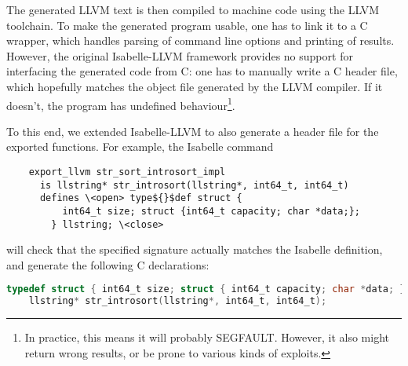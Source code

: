 \documentclass[runningheads]{llncs}
\begin{document}
{  The generated LLVM text is then compiled to machine code using the LLVM toolchain.
  To make the generated program usable, one has to link it to a C wrapper, which handles parsing of command line options and printing of results.
  However, the original Isabelle-LLVM framework provides no support for interfacing the generated code from C: one has to manually write a C header file, which hopefully matches the object file generated by the LLVM compiler. If it doesn't, the program has undefined behaviour\footnote{In practice, this means it will probably SEGFAULT. However, it also might return wrong results, or be prone to various kinds of exploits.}.


  To this end, we extended Isabelle-LLVM to also generate a header file for the exported functions. For example, the Isabelle command
  {\small\begin{lstlisting}
    export_llvm str_sort_introsort_impl
      is llstring* str_introsort(llstring*, int64_t, int64_t)
      defines \<open> type${}$def struct {
          int64_t size; struct {int64_t capacity; char *data;};
        } llstring; \<close>
  \end{lstlisting}}
  \noindent will check that the specified signature actually matches the Isabelle definition, and generate the following
  C declarations:
  {\small\begin{lstlisting}[language=C]
    typedef struct { int64_t size; struct { int64_t capacity; char *data; }; } llstring;
    llstring* str_introsort(llstring*, int64_t, int64_t);
  \end{lstlisting}}







  \newcommand{\plotintrosort}{
  \begin{tikzpicture}
    \begin{axis}[
      xlabel near ticks,
      legend style = {
        at = {(.77,.97)},
        cells={anchor=west},
        font=\scriptsize
      },
      title={\large Introsort},
      title style={at={(0.15,.85)}},
      ybar=0pt,
      width=\textwidth,
      height=.4\textheight,
      bar width=1.8pt,
      symbolic x coords={rev-sorted-end-10,rev-sorted-end-1,sorted-end-.1,almost-sorted-50,random-boolean,organ-pipe,sorted-end-10,equal,rev-sorted-middle-.1,rev-sorted,sorted-middle-1,rev-sorted-middle-10,random,almost-sorted-.1,sorted,rev-sorted-middle-1,sorted-middle-.1,almost-sorted-10,almost-sorted-1,sorted-middle-10,rev-sorted-end-.1,sorted-end-1,random-dup-10,}
      ,      xtick=data,
      x tick label style={rotate=45,anchor=east,font=\tiny},
    ]


\end{axis}
\end{tikzpicture}}}
\end{document}
